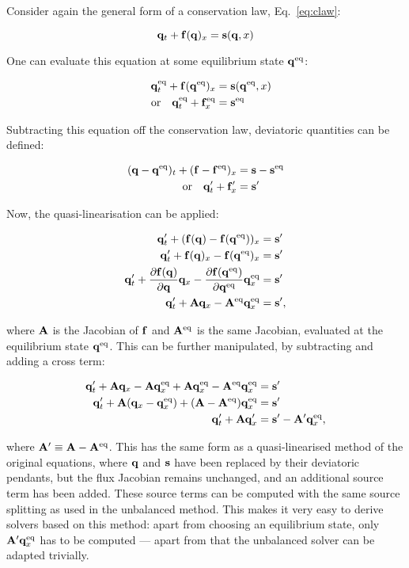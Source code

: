 Consider again the general form of a conservation law, Eq.~\ref{eq:claw}:

$$
  \vb q_t + \vb f(\vb q)_x = \vb s(\vb q, x)
$$

One can evaluate this equation at some equilibrium state $\vb q^\mathrm{eq}$:

\begin{align}
  \eq{\vb q}_t + \vb f(\eq{\vb q})_x &= \vb s(\eq{\vb q}, x) \\
  \qq{or} \eq{\vb q}_t + \eq{\vb f}_x &= \eq{\vb s}
\end{align}

Subtracting this equation off the conservation law, deviatoric quantities can be defined:

\begin{align}
  (\vb q - \eq{\vb q})_t + (\vb f - \eq{\vb f})_x &= \vb s - \eq{\vb s} \\
  \qq{or} \vb q'_t + \vb f'_x &= \vb s'
\end{align}

Now, the quasi-linearisation can be applied:

\begin{align}
  \vb q'_t + (\vb f(\vb q) - \vb f(\vb q^\mathrm{eq}))_x &= \vb s' \label{eq:rogers_discr}\\
  \vb q'_t + \vb f(\vb q)_x - \vb f(\vb q^\mathrm{eq})_x &= \vb s' \\
  \vb q'_t + \pdv{\vb f(\vb q)}{\vb q} \vb q_x - \pdv{\vb f(\vb q^\mathrm{eq})}{\vb q^\mathrm{eq}} \vb q^\mathrm{eq}_x &= \vb s' \\
  \vb q'_t + \vb A \vb q_x - \vb A^\mathrm{eq} \vb q^\mathrm{eq}_x &= \vb s',
\end{align}

where $\vb A$ is the Jacobian of $\vb f$ and $\vb A^\mathrm{eq}$ is the same Jacobian, evaluated at the equilibrium state $\vb q^\mathrm{eq}$. This can be further manipulated, by subtracting and adding a cross term:

\begin{align}
  \vb q'_t + \vb A \vb q_x - \vb A \vb q^\mathrm{eq}_x + \vb A \vb q^\mathrm{eq}_x - \vb A^\mathrm{eq} \vb q^\mathrm{eq}_x &= \vb s' \\
  \vb q'_t + \vb A (\vb q_x - \vb q^\mathrm{eq}_x) + (\vb A  - \vb A^\mathrm{eq}) \vb q^\mathrm{eq}_x &= \vb s' \\
  \vb q'_t + \vb A \vb q'_x &= \vb s' - \vb A' \vb q^\mathrm{eq}_x, \label{eq:rogers_method}
\end{align}

where $\vb A' \equiv \vb A - \vb A^\mathrm{eq}$. This has the same form as a quasi-linearised method of the original equations, where $\vb q$ and $\vb s$ have been replaced by their deviatoric pendants, but the flux Jacobian remains unchanged, and an additional source term has been added. These source terms can be computed with the same source splitting as used in the unbalanced method. This makes it very easy to derive solvers based on this method: apart from choosing an equilibrium state, only $\vb A' \vb q^\mathrm{eq}_x$ has to be computed --- apart from that the unbalanced solver can be adapted trivially.

